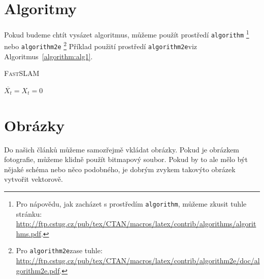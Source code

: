 \documentclass[a4paper, 11pt]{article}
\begin{document}
\newpage{}

\section{Algoritmy} \label{section:sec3}
Pokud budeme chtít vysázet algoritmus, můžeme použít prostředí \enspace\texttt{algorithm}
\footnote[2]{Pro nápovědu, jak zacházet s prostředím \enspace\texttt{algorithm}, můžeme zkusit tuhle stránku: \\
\href{http://ftp.cstug.cz/pub/tex/CTAN/macros/latex/contrib/algorithms/algorithms.pdf}{http://ftp.cstug.cz/pub/tex/CTAN/macros/latex/contrib/algorithms/algorithms.pdf}.}
\enspace nebo \enspace\texttt{algorithm2e}
\footnote[3]{Pro \enspace\texttt{algorithm2e}\enspace zase tuhle:
\href{http://ftp.cstug.cz/pub/tex/CTAN/macros/latex/contrib/algorithm2e/doc/algorithm2e.pdf}{http://ftp.cstug.cz/pub/tex/CTAN/macros/latex/contrib/algorithm2e/doc/algorithm2e.pdf}.}
Příklad použití prostředí \enspace\texttt{algorithm2e}\enspace viz Algoritmus~\ref{algorithm:alg1}.
\bigskip

\IncMargin{2em}
\begin{algorithm}
\caption{\textsc{FastSLAM}}
\label{algorithm:alg1}
\SetNlSty{}{}{:}
\SetNlSkip{0.6em}
\SetInd{1em}{1em}

\Indm
{}
\Indp
\BlankLine

$ \overline{X_t} = X_t = 0 $ \\


\end{algorithm}


\section{Obrázky} \label{section:sec4}
Do našich článků můžeme samozřejmě vkládat obrázky. Pokud je obrázkem fotografie, můžeme klidně použít bitmapový soubor. Pokud by to ale mělo být nějaké schéma nebo
něco podobného, je dobrým zvykem takovýto obrázek vytvořit vektorově.
\end{document}
